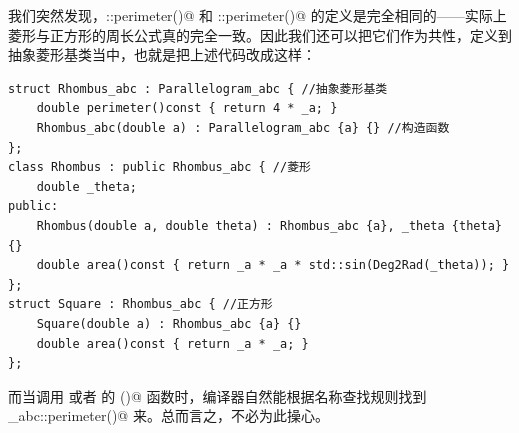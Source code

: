 我们突然发现，\lstinline@Rhombus::perimeter()@ 和 \lstinline@Square::perimeter()@ 的定义是完全相同的——实际上菱形与正方形的周长公式真的完全一致。因此我们还可以把它们作为共性，定义到抽象菱形基类当中，也就是把上述代码改成这样：
\begin{lstlisting}
struct Rhombus_abc : Parallelogram_abc { //抽象菱形基类
    double perimeter()const { return 4 * _a; }
    Rhombus_abc(double a) : Parallelogram_abc {a} {} //构造函数
};
class Rhombus : public Rhombus_abc { //菱形
    double _theta;
public:
    Rhombus(double a, double theta) : Rhombus_abc {a}, _theta {theta} {}
    double area()const { return _a * _a * std::sin(Deg2Rad(_theta)); }
};
struct Square : Rhombus_abc { //正方形
    Square(double a) : Rhombus_abc {a} {}
    double area()const { return _a * _a; }
};
\end{lstlisting}
而当调用 \lstinline@Rhombus@ 或者 \lstinline@square@ 的 \lstinline@perimeter()@ 函数时，编译器自然能根据名称查找规则找到 \lstinline@Rhombus_abc::perimeter()@ 来。总而言之，不必为此操心。\par
